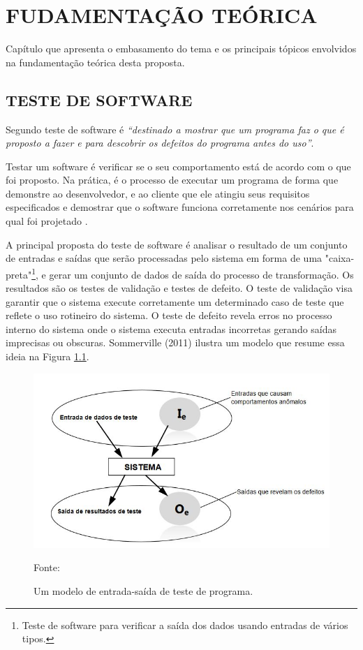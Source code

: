 
\chapter{FUDAMENTAÇÃO TEÓRICA}
\label{chap:fundamentacaoTeorica}

Capítulo que apresenta o embasamento do tema e os principais tópicos envolvidos na fundamentação teórica desta proposta.

\section{TESTE DE SOFTWARE}

Segundo \cite[p.~144]{SOMMER2011} teste de software é \textit{“destinado a mostrar que um programa faz o que é proposto a fazer e para descobrir os defeitos do programa antes do uso”}.

Testar um software é verificar se o seu comportamento está de acordo com o que foi proposto. Na prática, é o processo de executar um programa de forma que demonstre ao desenvolvedor, e ao cliente que ele atingiu seus requisitos especificados e demostrar que o software funciona corretamente nos cenários para qual foi projetado \cite{SOMMER2011}.

A principal proposta do teste de software é analisar o resultado de um conjunto de entradas e saídas que serão processadas pelo sistema em forma de uma "caixa-preta"\footnote{Teste de software para verificar a saída dos dados usando entradas de vários tipos.}, e gerar um conjunto de dados de saída do processo de transformação. Os resultados são os testes de validação e testes de defeito. O teste de validação visa garantir que o sistema execute corretamente um determinado caso de teste que reflete o uso rotineiro do sistema. O teste de defeito revela erros no processo interno do sistema onde o sistema executa entradas incorretas gerando saídas imprecisas ou obscuras. Sommerville (2011) ilustra um modelo que resume essa ideia na Figura \ref{modeloEntradaSaida}.  

\begin{figure}[h!]
	\centering
	\includegraphics[scale=0.7]{dados/figuras/modelo_entradaSaida.JPG}
	\caption{Um modelo de entrada-saída de teste de programa.}
	Fonte: \cite[p.~145]{SOMMER2011}
	\label{modeloEntradaSaida}
\end{figure}


